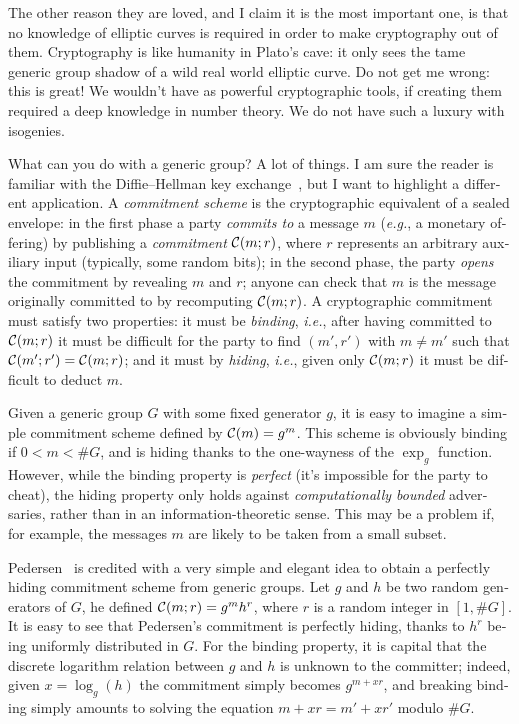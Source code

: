 \begin{otherlanguage}{english}
  The other reason they are loved, and I claim it is the most
  important one, is that no knowledge of elliptic curves is required
  in order to make cryptography out of them.  Cryptography is like
  humanity in Plato's cave: it only sees the tame generic group shadow
  of a wild real world elliptic curve. Do not get me wrong: this is
  great! We wouldn't have as powerful cryptographic tools, if creating
  them required a deep knowledge in number theory. We do not have such
  a luxury with isogenies.
  
  What can you do with a generic group? A lot of things. I am sure the
  reader is familiar with the Diffie--Hellman key
  exchange~\cite{DifHel76}, but I want to highlight a different
  application. A \emph{commitment scheme} is the cryptographic
  equivalent of a sealed envelope: in the first phase a party
  \emph{commits to} a message $m$ (\emph{e.g.}, a monetary offering)
  by publishing a \emph{commitment} $\mathcal{C}(m;r)$, where $r$ represents
  an arbitrary auxiliary input (typically, some random bits); in the
  second phase, the party \emph{opens} the commitment by revealing $m$
  and $r$; anyone can check that $m$ is the message originally
  committed to by recomputing $\mathcal{C}(m;r)$.  A cryptographic commitment
  must satisfy two properties: it must be \emph{binding}, \emph{i.e.},
  after having committed to $\mathcal{C}(m;r)$ it must be difficult for the
  party to find $(m',r')$ with $m\ne m'$ such that
  $\mathcal{C}(m';r')=\mathcal{C}(m;r)$; and it must by \emph{hiding}, \emph{i.e.},
  given only $\mathcal{C}(m;r)$ it must be difficult to deduct $m$.

  Given a generic group $G$ with some fixed generator $g$, it is easy
  to imagine a simple commitment scheme defined by $\mathcal{C}(m) =
  g^m$. This scheme is obviously binding if $0<m<\#G$, and is hiding
  thanks to the one-wayness of the $\exp_g$ function. However, while
  the binding property is \emph{perfect} (it's impossible for the
  party to cheat), the hiding property only holds against
  \emph{computationally bounded} adversaries, rather than in an
  information-theoretic sense. This may be a problem if, for example,
  the messages $m$ are likely to be taken from a small subset.

  Pedersen~\cite{C:Pedersen91} is credited with a very simple and
  elegant idea to obtain a perfectly hiding commitment scheme from
  generic groups. Let $g$ and $h$ be two random generators of $G$, he
  defined $\mathcal{C}(m;r)=g^m h^r$, where $r$ is a random integer in
  $[1,\#G]$. It is easy to see that Pedersen's commitment is perfectly
  hiding, thanks to $h^r$ being uniformly distributed in $G$. For the
  binding property, it is capital that the discrete logarithm relation
  between $g$ and $h$ is unknown to the committer; indeed, given
  $x=\log_g(h)$ the commitment simply becomes $g^{m+xr}$, and breaking
  binding simply amounts to solving the equation $m+xr=m'+xr'$ modulo
  $\#G$.


\end{otherlanguage}
